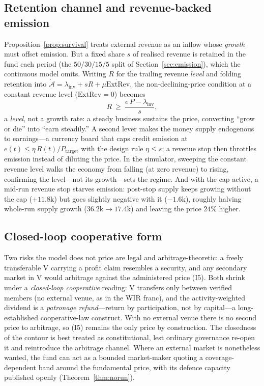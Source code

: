 \documentclass[11pt]{article}
\theoremstyle{plain}
\theoremstyle{definition}
\theoremstyle{remark}
\newcommand{\V}{\mathrm{V}}
\newcommand{\ExtRev}{\mathrm{ExtRev}}
\begin{document}
\subsection{Retention channel and revenue-backed emission}

Proposition~\ref{prop:survival} treats external revenue as an inflow whose \emph{growth} must offset emission. But a fixed share $s$ of realised revenue is retained in the fund each period (the $50/30/15/5$ split of Section~\ref{sec:emission}), which the continuous model omits. Writing $R$ for the trailing revenue \emph{level} and folding retention into $\dot{\mathcal A}=\lambda_{\mathrm{inv}}+sR+\mu\dot{\ExtRev}$, the non-declining-price condition at a constant revenue level ($\dot{\ExtRev}=0$) becomes
\[
R \ \ge\ \frac{e\,P-\lambda_{\mathrm{inv}}}{s},
\]
a \emph{level}, not a growth rate: a steady business sustains the price, converting ``grow or die'' into ``earn steadily.'' A second lever makes the money supply endogenous to earnings---a currency board that caps credit emission at $e(t)\le\eta\,R(t)/P_{\mathrm{target}}$ with the design rule $\eta\le s$; a revenue stop then throttles emission instead of diluting the price. In the simulator, sweeping the constant revenue level walks the economy from falling (at zero revenue) to rising, confirming the level---not its growth---sets the regime. And with the cap active, a mid-run revenue stop starves emission: post-stop supply keeps growing without the cap ($+11.8\mathrm{k}$) but goes slightly negative with it ($-1.6\mathrm{k}$), roughly halving whole-run supply growth ($36.2\mathrm{k}\to17.4\mathrm{k}$) and leaving the price $24\%$ higher.

\subsection{Closed-loop cooperative form}

Two risks the model does not price are legal and arbitrage-theoretic: a freely transferable $\V$ carrying a profit claim resembles a security, and any secondary market in $\V$ would arbitrage against the administered price (I5). Both shrink under a \emph{closed-loop cooperative} reading: $\V$ transfers only between verified members (no external venue, as in the WIR franc), and the activity-weighted dividend is a \emph{patronage refund}---return by participation, not by capital---a long-established cooperative-law construct. With no external venue there is no second price to arbitrage, so (I5) remains the only price by construction. The closedness of the contour is best treated as constitutional, lest ordinary governance re-open it and reintroduce the arbitrage channel. Where an external market is nonetheless wanted, the fund can act as a bounded market-maker quoting a coverage-dependent band around the fundamental price, with its defence capacity published openly (Theorem~\ref{thm:norun}).
\end{document}
